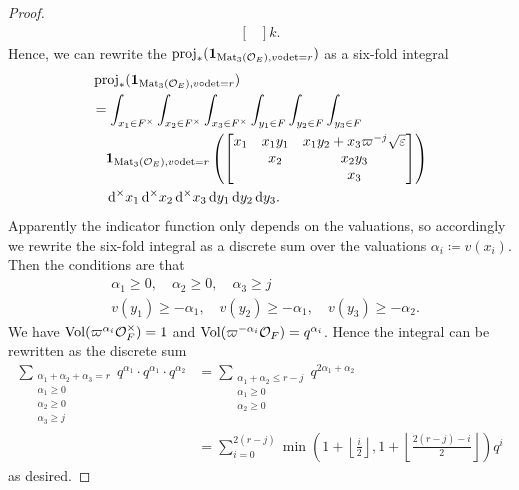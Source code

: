 \begin{proof}
\begin{align*}
\begin{bmatrix}
    \end{bmatrix}
    k.
  \end{align*}
  Hence, we can rewrite the $\operatorname{proj}_\ast(\mathbf{1}_{\operatorname{Mat}_3(\mathcal O_E), v\circ\det=r})$
  as a six-fold integral
  \begin{align*}
    &\rproj_\ast(\mathbf{1}_{\Mat_3(\OO_E), v\circ\det=r}) \\
    &= \int_{x_1 \in F^\times} \int_{x_2 \in F^\times} \int_{x_3 \in F^\times}
    \int_{y_1 \in F} \int_{y_2 \in F} \int_{y_3 \in F} \\
    &\quad \mathbf{1}_{\Mat_3(\OO_E), v\circ\det=r} \left(
    \begin{bmatrix}
      x_1 & x_1 y_1 & x_1 y_2 + x_3 \varpi^{-j} \sqrt\eps \\
      & x_2 & x_2 y_3 \\
      & & x_3
    \end{bmatrix}
    \right) \\
    &\quad \odif[{\times,\times,\times}]{x_1,x_2,x_3,y_1,y_2,y_3}.
  \end{align*}
  Apparently the indicator function only depends on the valuations,
  so accordingly we rewrite the six-fold integral as a discrete sum over the valuations
  $\alpha_i \coloneqq v(x_i)$.
  Then the conditions are that
  \begin{align*}
    &\alpha_1 \ge 0, \quad \alpha_2 \ge 0, \quad \alpha_3 \ge j \\
    &v(y_1) \ge - \alpha_1, \quad v(y_2) \ge - \alpha_1, \quad v(y_3) \ge -\alpha_2.
  \end{align*}
  We have $\operatorname{Vol}(\varpi^{\alpha_i} \mathcal O_F^\times) = 1$
  and $\operatorname{Vol}(\varpi^{-\alpha_i} \mathcal O_F) = q^{\alpha_i}$.
  Hence the integral can be rewritten as the discrete sum
  \begin{align*}
    \sum_{\substack{\alpha_1 + \alpha_2 + \alpha_3 = r \\ \alpha_1 \ge 0 \\ \alpha_2 \ge 0 \\ \alpha_3 \ge j}}
    q^{\alpha_1} \cdot q^{\alpha_1} \cdot q^{\alpha_2}
    &= \sum_{\substack{\alpha_1 + \alpha_2 \le r-j \\ \alpha_1 \ge 0 \\ \alpha_2 \ge 0}}
    q^{2\alpha_1+\alpha_2} \\
    &= \sum_{i=0}^{2(r-j)}
    \min \left( 1 + \left\lfloor \frac i2 \right\rfloor,
      1 + \left\lfloor \frac{2(r-j)-i}{2} \right\rfloor
    \right) q^i
  \end{align*}
  as desired.
\end{proof}

